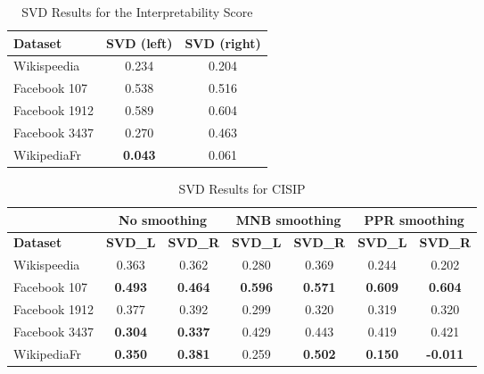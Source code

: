 \begin{table}[t]
    \caption{SVD Results for the Interpretability Score}
    \begin{center}
        \begin{tabular}{l|c|c}
            \hline
            \textbf{Dataset} & \textbf{SVD (left)} & \textbf{SVD (right)}\\
            \hline
Wikispeedia  & 0.234 & 0.204\\
Facebook 107 & 0.538 & 0.516\\
Facebook 1912 & 0.589 & 0.604\\
Facebook 3437 & 0.270 & 0.463\\
WikipediaFr  & \textbf{0.043} & 0.061\\
\hline
        \end{tabular}
    \end{center}
    \label{tab:IS_SVD_scores}
\end{table}

\begin{table}[t]
\caption{SVD Results for CISIP}
\begin{center}
\begin{tabular}{l|c|c|c|c|c|c}
\hline
 & \multicolumn{2}{c|}{No smoothing} & \multicolumn{2}{c|}{MNB smoothing} & \multicolumn{2}{c}{PPR smoothing}\\
\hline
\textbf{Dataset} & \textbf{SVD\_L} & \textbf{SVD\_R} & \textbf{SVD\_L} & \textbf{SVD\_R} & \textbf{SVD\_L} & \textbf{SVD\_R}\\
\hline
Wikispeedia  & 0.363 & 0.362 & 0.280 & 0.369 & 0.244 & 0.202\\
Facebook 107 & \textbf{0.493} & \textbf{0.464} & \textbf{0.596} & \textbf{0.571} & \textbf{0.609} & \textbf{0.604}\\
Facebook 1912 & 0.377 & 0.392 & 0.299 & 0.320 & 0.319 & 0.320\\
Facebook 3437 & \textbf{0.304} & \textbf{0.337} & 0.429 & 0.443 & 0.419 & 0.421\\
WikipediaFr  & \textbf{0.350} & \textbf{0.381} & 0.259 & \textbf{0.502} & \textbf{0.150} & \textbf{-0.011}\\
\hline
\end{tabular}
\end{center}
\label{tab:CISIP_SVD_scores}
\end{table}
